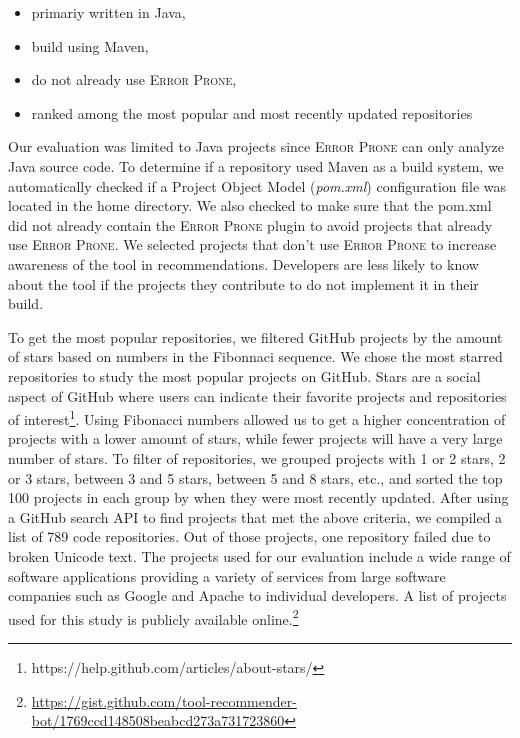 \documentclass[sigconf,review,anonymous]{acmart}
\begin{document}
\begin{itemize}
\item primariy written in Java,
\item build using Maven,
\item do not already use \textsc{Error Prone},
\item ranked among the most popular and most recently updated repositories
\end{itemize}

Our evaluation was limited to Java projects since \textsc{Error Prone} can only analyze Java source code. To determine if a repository used Maven as a build system, we automatically checked if a Project Object Model (\textit{pom.xml}) configuration file was located in the home directory. We also checked to make sure that the pom.xml did not already contain the \textsc{Error Prone} plugin to avoid projects that already use \textsc{Error Prone}. We selected projects that don't use \textsc{Error Prone} to increase awareness of the tool in recommendations. Developers are less likely to know about the tool if the projects they contribute to do not implement it in their build. 

To get the most popular repositories, we filtered GitHub projects by the amount of stars based on numbers in the Fibonnaci sequence. We chose the most starred repositories to study the most popular projects on GitHub. Stars are a social aspect of GitHub where users can indicate their favorite projects and repositories of interest\footnote{https://help.github.com/articles/about-stars/}. Using Fibonacci numbers allowed us to get a higher concentration of projects with a lower amount of stars, while fewer projects will have a very large number of stars. To filter of repositories, we grouped projects with 1 or 2 stars, 2 or 3 stars, between 3 and 5 stars, between 5 and 8 stars, etc., and sorted the top 100 projects in each group by when they were most recently updated. After using a GitHub search API to find projects that met the above criteria, we compiled a list of 789 code repositories. Out of those projects, one repository failed due to broken Unicode text. %
The projects used for our evaluation include a wide range of software applications providing a variety of services from large software companies such as Google and Apache to individual developers. A list of projects used for this study is publicly available online.\footnote{\url{https://gist.github.com/tool-recommender-bot/1769ccd148508beabcd273a731723860}}
\end{document}

